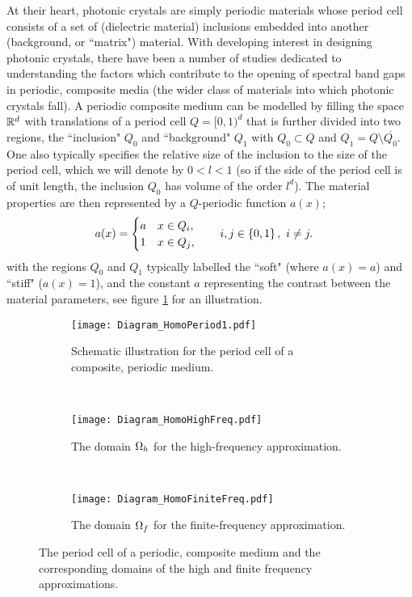 At their heart, photonic crystals are simply periodic materials whose period cell consists of a set of (dielectric material) inclusions embedded into another (background, or ``matrix") material.
With developing interest in designing photonic crystals, there have been a number of studies dedicated to understanding the factors which contribute to the opening of spectral band gaps in periodic, composite media (the wider class of materials into which photonic crystals fall).
A periodic composite medium can be modelled by filling the space $\mathbb{R}^d$ with translations of a period cell $Q=[0,1)^d$ that is further divided into two regions, the ``inclusion" $Q_0$ and ``background" $Q_1$ with $Q_0\subset Q$ and $Q_1=Q\setminus\overline{Q_0}$.
One also typically specifies the relative size of the inclusion to the size of the period cell, which we will denote by $0<l<1$ (so if the side of the period cell is of unit length, the inclusion $Q_0$ has volume of the order $l^d$).
The material properties are then represented by a $Q$-periodic function $a(x)$;
\begin{align*}
	a(x) &= \begin{cases} a & x\in Q_i, \\ 1 & x\in Q_j, \end{cases}
	\qquad i,j\in\left\{ 0,1 \right\}, \ i\neq j.
\end{align*}
with the regions $Q_0$ and $Q_1$ typically labelled the ``soft" (where $a(x)=a$) and ``stiff" ($a(x)=1$), and the constant $a$ representing the contrast between the material parameters, see figure \ref{fig:Diagram_HomoPeriod1} for an illustration.
\begin{figure}[b!]
	\centering
	\begin{subfigure}[t]{0.3\textwidth}
		\centering
		\texttt{[image: Diagram\_HomoPeriod1.pdf]}
		\caption{\label{fig:Diagram_HomoPeriod1} Schematic illustration for the period cell of a composite, periodic medium.}
	\end{subfigure}
	~
	\begin{subfigure}[t]{0.3\textwidth}
		\centering
		\texttt{[image: Diagram\_HomoHighFreq.pdf]}
		\caption{\label{fig:Diagram_HomoHighFreq} The domain $\Omega_h$ for the high-frequency approximation.}
	\end{subfigure}
	~
	\begin{subfigure}[t]{0.3\textwidth}
		\centering
		\texttt{[image: Diagram\_HomoFiniteFreq.pdf]}
		\caption{\label{fig:Diagram_HomoFiniteFreq} The domain $\Omega_f$ for the finite-frequency approximation.}
	\end{subfigure}
	\caption{\label{fig:Diagram_HomoFreqRanges} The period cell of a periodic, composite medium and the corresponding domains of the high and finite frequency approximations.}	
\end{figure}
